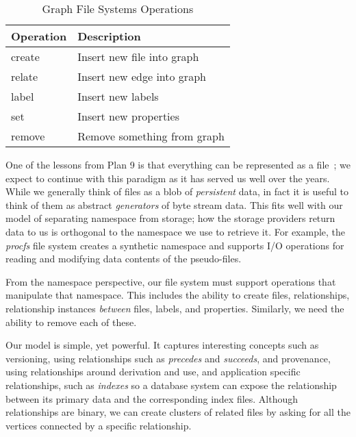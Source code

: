\begin{table}[b]
    \small
    \captionsetup{justification=centering}
    \begin{tabular}{p{2cm}p{5cm}}
        Operation & Description\tabularnewline\hline
        \multirow{1}{*}{create} &
        \multirow{1}{*}{\parbox{4.8cm}{Insert new file into graph}}
        \tabularnewline
        \multirow{1}{*}{relate} &
        \multirow{1}{*}{\parbox{4.8cm}{Insert new edge into graph}}
        \tabularnewline
        \multirow{1}{*}{label} &
        \multirow{1}{*}{\parbox{4.8cm}{Insert new labels}}
        \tabularnewline
        \multirow{1}{*}{set} &
        \multirow{1}{*}{\parbox{4.8cm}{Insert new properties}}
        \tabularnewline
        \multirow{1}{*}{remove} &
        \multirow{1}{*}{\parbox{4.8cm}{Remove something from graph}}
        \tabularnewline
    \end{tabular}
    \caption{Graph File Systems Operations}\label{table:graphfs:operations}
\end{table}


One of the lessons from Plan 9 is that everything can be represented as a file~\cite{pike1992use};
we expect to
continue with this paradigm as it has served us well over the years.  While we generally
think of files as a blob of \textit{persistent} data, in fact it is useful to
think of them as abstract \textit{generators} of byte stream data.  This fits well
with our model of separating namespace from storage; how the storage
providers return data to us is orthogonal to the namespace we use to retrieve it.
For example, the \textit{procfs} file system creates a synthetic namespace and supports
I/O operations for reading and modifying data contents of the pseudo-files.

From the namespace perspective, our file system must support operations that manipulate that
namespace. This includes the ability to create files, relationships,
relationship instances \textit{between} files, labels, and properties.
Similarly, we need the ability to remove each of these.

Our model is simple, yet powerful.  It captures interesting concepts such as versioning, using relationships such as
\textit{precedes} and \textit{succeeds},
and provenance, using relationships around derivation and use,
and application specific relationships, such as \textit{indexes} so a database
system can expose the relationship between its primary data and the
corresponding index files.
Although relationships are binary,
we can create clusters of related files by asking for all the vertices connected
by a specific relationship.

